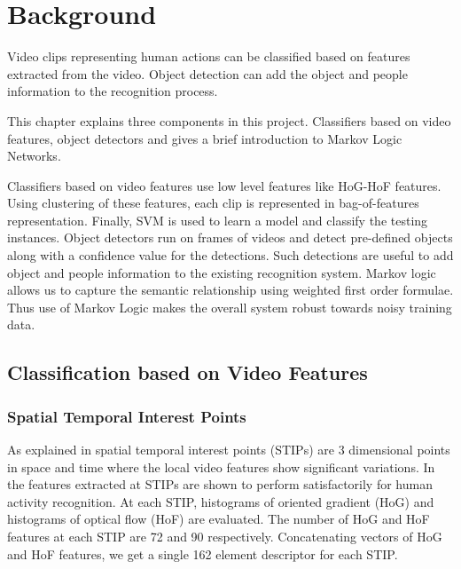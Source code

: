 \chapter{Background}

\label{ch2_BACKGROUND}


Video clips representing human actions can be classified based on features extracted from the video.
Object detection can add the object and people information to the recognition process.

This chapter explains three components in this project. 
Classifiers based on video features, object detectors and gives a brief introduction to Markov Logic Networks.

Classifiers based on video features use low level features like HoG-HoF features.
Using clustering of these features, each clip is represented in bag-of-features representation.
Finally, SVM is used to learn a model and classify the testing instances. Object detectors run on frames of videos and detect pre-defined objects along with
a confidence value for the detections. Such detections are useful to add object and people information
to the existing recognition system. Markov logic allows us to capture the semantic relationship using weighted first order formulae.
Thus use of Markov Logic makes the overall system robust towards noisy training data.


\section{Classification based on Video Features}
\label{section_STIP}
\subsection{Spatial Temporal Interest Points}
As explained in \cite{laptev2005} spatial temporal interest points (STIPs) are 3 dimensional points in 
space and time where the local video features show significant variations. 
In \cite{actionsInContext} the features extracted at STIPs are shown to perform satisfactorily for human activity recognition. 
At each STIP, histograms of oriented gradient (HoG) and  histograms of optical flow (HoF) are evaluated.
The number of HoG and HoF features at each STIP are 72 and 90 respectively.
Concatenating vectors of HoG and HoF features, we get a single 162 element descriptor for each STIP. 

